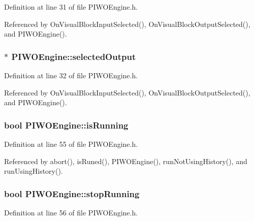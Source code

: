 Definition at line 31 of file PIWOEngine.h.

Referenced by OnVisualBlockInputSelected(), OnVisualBlockOutputSelected(), and PIWOEngine().\hypertarget{classPIWOEngine_3008a57c7914a602b34bf470a90d2bb6}{
\subsubsection[selectedOutput]{$\ast$ {\bf PIWOEngine::selectedOutput}}}
\label{classPIWOEngine_3008a57c7914a602b34bf470a90d2bb6}




Definition at line 32 of file PIWOEngine.h.

Referenced by OnVisualBlockInputSelected(), OnVisualBlockOutputSelected(), and PIWOEngine().\hypertarget{classPIWOEngine_58d8519fdc284ac5b088d4b9ead41de1}{
\subsubsection[isRunning]{\setlength{\rightskip}{0pt plus 5cm}bool {\bf PIWOEngine::isRunning}}}
\label{classPIWOEngine_58d8519fdc284ac5b088d4b9ead41de1}




Definition at line 55 of file PIWOEngine.h.

Referenced by abort(), isRuned(), PIWOEngine(), runNotUsingHistory(), and runUsingHistory().\hypertarget{classPIWOEngine_fb15e05147a0a299649307876eb97412}{
\subsubsection[stopRunning]{\setlength{\rightskip}{0pt plus 5cm}bool {\bf PIWOEngine::stopRunning}}}
\label{classPIWOEngine_fb15e05147a0a299649307876eb97412}




Definition at line 56 of file PIWOEngine.h.

